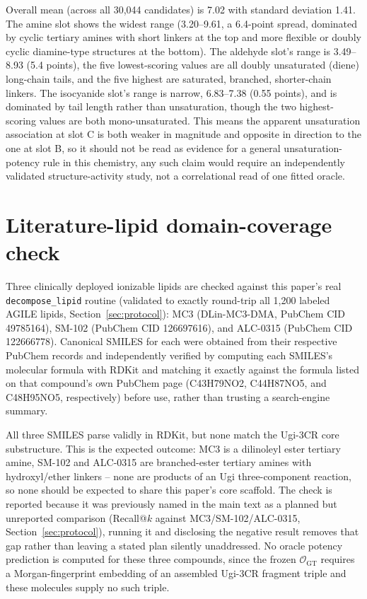 Overall mean (across all 30,044 candidates) is 7.02 with standard deviation 1.41. The amine slot shows the widest range (3.20--9.61, a 6.4-point spread, dominated by cyclic tertiary amines with short linkers at the top and more flexible or doubly cyclic diamine-type structures at the bottom). The aldehyde slot's range is 3.49--8.93 (5.4 points), the five lowest-scoring values are all doubly unsaturated (diene) long-chain tails, and the five highest are saturated, branched, shorter-chain linkers. The isocyanide slot's range is narrow, 6.83--7.38 (0.55 points), and is dominated by tail length rather than unsaturation, though the two highest-scoring values are both mono-unsaturated. This means the apparent unsaturation association at slot C is both weaker in magnitude and opposite in direction to the one at slot B, so it should not be read as evidence for a general unsaturation-potency rule in this chemistry, any such claim would require an independently validated structure-activity study, not a correlational read of one fitted oracle.

\section{Literature-lipid domain-coverage check}
\label{app:lit-lipids}
Three clinically deployed ionizable lipids are checked against this paper's real \texttt{decompose\_lipid} routine (validated to exactly round-trip all 1,200 labeled AGILE lipids, Section~\ref{sec:protocol}): MC3 (DLin-MC3-DMA, PubChem CID 49785164), SM-102 (PubChem CID 126697616), and ALC-0315 (PubChem CID 122666778). Canonical SMILES for each were obtained from their respective PubChem records and independently verified by computing each SMILES's molecular formula with RDKit and matching it exactly against the formula listed on that compound's own PubChem page (C43H79NO2, C44H87NO5, and C48H95NO5, respectively) before use, rather than trusting a search-engine summary.

All three SMILES parse validly in RDKit, but none match the Ugi-3CR core substructure. This is the expected outcome: MC3 is a dilinoleyl ester tertiary amine, SM-102 and ALC-0315 are branched-ester tertiary amines with hydroxyl/ether linkers -- none are products of an Ugi three-component reaction, so none should be expected to share this paper's core scaffold. The check is reported because it was previously named in the main text as a planned but unreported comparison (Recall@$k$ against MC3/SM-102/ALC-0315, Section~\ref{sec:protocol}), running it and disclosing the negative result removes that gap rather than leaving a stated plan silently unaddressed. No oracle potency prediction is computed for these three compounds, since the frozen $\mathcal O_{\mathrm{GT}}$ requires a Morgan-fingerprint embedding of an assembled Ugi-3CR fragment triple and these molecules supply no such triple.


